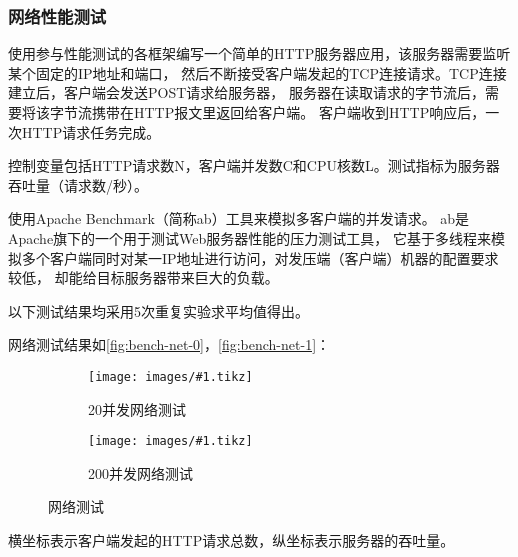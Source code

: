 \documentclass[supercite]{HustGraduPaper}
\newcommand{\cfig}[3]{
  \begin{figure}[htb]
    \centering
    \texttt{[image: images/\#1.tikz]}
    \caption{#3}
    \label{fig:#1}
  \end{figure}
}
\newcommand{\sfig}[3]{
  \begin{subfigure}[b]{#2\textwidth}
    \texttt{[image: images/\#1.tikz]}
    \caption{#3}
    \label{fig:#1}
  \end{subfigure}
}
\newcommand{\xfig}[3]{
  \begin{figure}[htb]
    \centering
    #3
    \caption{#2}
    \label{fig:#1}
  \end{figure}
}
\newcommand{\rfig}[1]{\autoref{fig:#1}}
\theoremstyle{definition}
\begin{document}
\subsubsection{网络性能测试}


使用参与性能测试的各框架编写一个简单的HTTP服务器应用，该服务器需要监听某个固定的IP地址和端口，
然后不断接受客户端发起的TCP连接请求。TCP连接建立后，客户端会发送POST请求给服务器，
服务器在读取请求的字节流后，需要将该字节流携带在HTTP报文里返回给客户端。
客户端收到HTTP响应后，一次HTTP请求任务完成。\par

控制变量包括HTTP请求数N，客户端并发数C和CPU核数L。测试指标为服务器吞吐量（请求数/秒）。\par

使用Apache Benchmark\cite{brunelle2013evaluating}（简称ab）工具来模拟多客户端的并发请求。
ab是Apache旗下的一个用于测试Web服务器性能的压力测试工具，
它基于多线程来模拟多个客户端同时对某一IP地址进行访问，对发压端（客户端）机器的配置要求较低，
却能给目标服务器带来巨大的负载。\par

以下测试结果均采用5次重复实验求平均值得出。\par

网络测试结果如\rfig{bench-net-0}，\rfig{bench-net-1}：\par

%

\xfig{bench-net}{网络测试}{
  \sfig{bench-net-0}{0.4}{20并发网络测试}
  \sfig{bench-net-1}{0.4}{200并发网络测试}
}

横坐标表示客户端发起的HTTP请求总数，纵坐标表示服务器的吞吐量。\par

\end{document}
